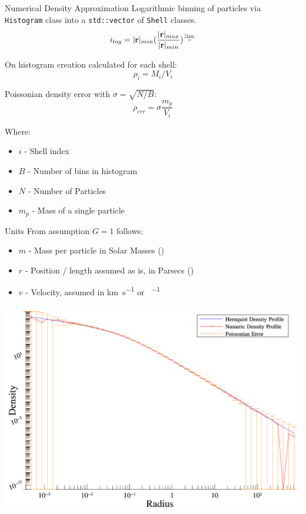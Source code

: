 \begin{frame}{Numerical Density Approximation}
	Logarithmic binning of particles via \texttt{Histogram} class into a \texttt{std::vector} of \texttt{Shell}
	classes.
	\begin{equation}
		i_{log} = |\vb{r}|_{min} (\frac{|\vb{r}|_{max}}{|\vb{r}|_{min}})^{\frac {i_{lin}}{n}}
		\label{eq:lin-to-log}
	\end{equation}

	On histogram creation calculated for each shell:
	\begin{equation}
		\rho_i = M_i / V_i
		\label{eq:numeric-density}
	\end{equation}

	Poissonian density error with $\sigma = \sqrt{N / B}$:
	\begin{equation}
		\rho_{err} = \sigma \frac{m_p}{V_i}
		\label{eq:density-error}
	\end{equation}

	{\footnotesize Where:
	\begin{itemize}
		\item $i$ - Shell index
		\item $B$ - Number of bins in histogram
		\item $N$ - Number of Particles
		\item $m_p$ - Mass of a single particle
	\end{itemize}}

\end{frame}

\begin{frame}{Units}
	From assumption $G=1$ follows:

	\begin{itemize}
		\item $m$ - Mass per particle in Solar Masses (\si{\solarmass})
		\item $r$ - Position / length assumed as is, in Parsecs (\si{\parsec})
		\item $v$ - Velocity, assumed in \si{\kilo\metre\per\second} or \si{\parsec\per\year}
	\end{itemize}
\end{frame}

\begin{frame}
	\includegraphics[width=.95\textwidth]{figures/plots/hernquist.png}
\end{frame}

